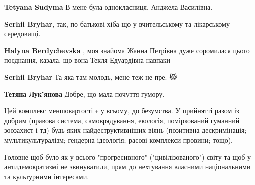 \begin{itemize}
\begin{itemize}
\textbf{Tetyana Sudyma}
В мене була однокласниця,
Анджела Василівна.

 
\textbf{Serhii Bryhar}, так, по батькові хіба що у вчительському та лікарському середовищі.

 
\textbf{Halyna Berdychevska} , моя знайома Жанна Петрівна дуже соромилася цього поєднання, казала, що вона Текля Едуардівна навпаки \Laughey[1.0][white]

 
\textbf{Serhii Bryhar} Та яка там молодь, мене теж не пре. 😹

 
\textbf{Тетяна Лук'янова}
Добре, що мала почуття гумору.

 

Цей комплекс меншовартості є у всьому, до безумства. У прийнятті разом із
добрим (правова система, самоврядування, екологія, поміркований гуманний
зоозахист і тд) будь яких найдеструктивніших віянь (позитивна дескримінація;
мультикультуралізм; гендерна ідеологія; расові комплекси провини; тощо).

Головне щоб було як у всього "прогресивного" ("цивілізованого") світу та щоб у
антидемократизмі не звинуватили, прям до нехтування власними національними та
культурними інтересами.


\end{itemize}
\end{itemize}

